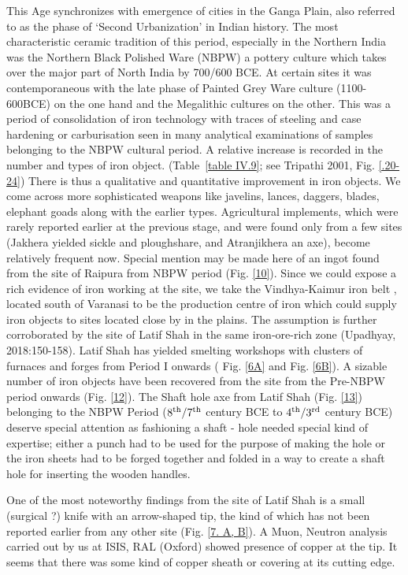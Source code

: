 This Age synchronizes with emergence of cities in the Ganga Plain, also referred to as the phase of ‘Second Urbanization’ in Indian history. The most characteristic ceramic tradition of this period, especially in the Northern India was the Northern Black Polished Ware (NBPW) a pottery culture which takes over the major part of North India by 700/600 BCE. At certain sites it was contemporaneous with the late phase of Painted Grey Ware culture (1100-600BCE) on the one hand and the Megalithic cultures on the other. This was a period of consolidation of iron technology with traces of steeling and case hardening or carburisation seen in many analytical examinations of samples belonging to the NBPW cultural period. A relative increase is recorded in the number and types of iron object. (Table~\ref{table IV.9}; see Tripathi 2001, Fig. \ref{.20-24}) There is thus a qualitative and quantitative improvement in iron objects. We come across more sophisticated weapons like javelins, lances, daggers, blades, elephant goads along with the earlier types. Agricultural implements, which were rarely reported earlier at the previous stage, and were found only from a few sites (Jakhera yielded sickle and ploughshare, and Atranjikhera an axe), become relatively frequent now. Special mention may be made here of an ingot found from the site of Raipura from NBPW period (Fig. \ref{10}). Since we could expose a rich evidence of iron working at the site, we take the Vindhya-Kaimur iron belt , located south of Varanasi to be the production centre of iron which could supply iron objects to sites located close by in the plains. The assumption is further corroborated by the site of Latif Shah in the same iron-ore-rich zone (Upadhyay, 2018:150-158). Latif  Shah  has yielded smelting workshops with clusters of furnaces and forges from Period I onwards ( Fig. \ref{6A} and  Fig. \ref{6B}). A sizable number of iron objects have been recovered from the site from the Pre-NBPW period onwards (Fig. \ref{12}). The Shaft hole axe from Latif Shah (Fig. \ref{13}) belonging to the NBPW Period ($8^{\rm th}/7^{\rm th}$ century BCE to $4^{\rm th}/3^{\rm rd}$ century BCE) deserve special attention as fashioning a shaft - hole needed special kind of expertise; either a punch had to be used for the purpose of making the hole or the iron sheets had to be forged together and folded in a way to create a shaft hole for inserting the wooden handles. 

One of the most noteworthy findings from the site of Latif Shah is a small (surgical ?) knife with an arrow-shaped tip, the kind of which has not been reported earlier from any other site (Fig. \ref{7. A, B}). A Muon, Neutron analysis carried out by us at ISIS, RAL (Oxford) showed presence of copper at the tip. It seems that there was some kind of copper sheath or covering at its cutting edge. 

